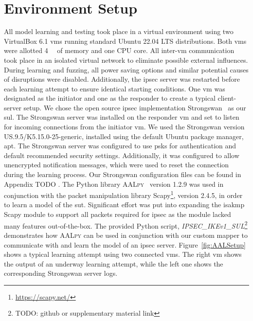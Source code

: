 \section{Environment Setup} \label{sec:env}
All model learning and testing took place in a virtual environment using two VirtualBox 6.1 \acp{vm} running standard Ubuntu 22.04 LTS distributions. Both \acp{vm} were allotted \SI{4}{\giga\byte} of memory and one CPU core. All inter-\ac{vm} communication took place in an isolated virtual network to eliminate possible external influences. During learning and fuzzing, all power saving options and similar potential causes of disruptions were disabled. Additionally, the \ac{ipsec} server was restarted before each learning attempt to ensure identical starting conditions. One \ac{vm} was designated as the initiator and one as the responder to create a typical client-server setup. We chose the open source \ac{ipsec} implementation Strongswan~\cite{software:strongswan} as our \ac{sul}. The Strongswan server was installed on the responder \ac{vm} and set to listen for incoming connections from the initiator \ac{vm}. We used the Strongswan version US.9.5/K5.15.0-25-generic, installed using the default Ubuntu package manager, apt. The Strongswan server was configured to use \acp{psk} for authentication and default recommended security settings. Additionally, it was configured to allow unencrypted notification messages, which were used to reset the connection during the learning process. Our Strongswan configuration files can be found in Appendix TODO . The Python library \textsc{AALpy}~\cite{software:aalpy} version 1.2.9 was used in conjunction with the packet manipulation library Scapy\footnote{\url{https://scapy.net/}}, version 2.4.5, in order to learn a model of the \ac{sut}. Significant effort was put into expanding the \ac{isakmp} Scapy module to support all packets required for \ac{ipsec} as the module lacked many features out-of-the-box. The provided Python script, \emph{IPSEC\_IKEv1\_SUL}\footnote{TODO: github or supplementary material link} demonstrates how \textsc{AALpy} can be used in conjunction with our custom mapper to communicate with and learn the model of an \ac{ipsec} server. Figure~\ref{fig:AALSetup} shows a typical learning attempt using two connected \acp{vm}. The right \ac{vm} shows the output of an underway learning attempt, while the left one shows the corresponding Strongswan server logs.
\fi

